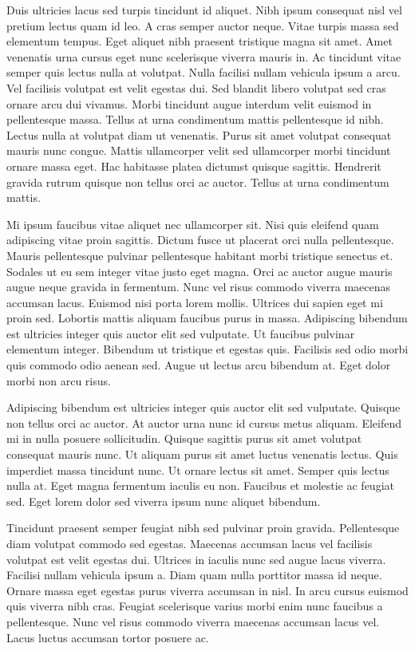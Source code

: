 \documentclass[11pt,a4paper]{article}
\begin{document}
Duis ultricies lacus sed turpis tincidunt id aliquet. Nibh ipsum consequat nisl vel pretium lectus quam id leo. A cras semper auctor neque. Vitae turpis massa sed elementum tempus. Eget aliquet nibh praesent tristique magna sit amet. Amet venenatis urna cursus eget nunc scelerisque viverra mauris in. Ac tincidunt vitae semper quis lectus nulla at volutpat. Nulla facilisi nullam vehicula ipsum a arcu. Vel facilisis volutpat est velit egestas dui. Sed blandit libero volutpat sed cras ornare arcu dui vivamus. Morbi tincidunt augue interdum velit euismod in pellentesque massa. Tellus at urna condimentum mattis pellentesque id nibh. Lectus nulla at volutpat diam ut venenatis. Purus sit amet volutpat consequat mauris nunc congue. Mattis ullamcorper velit sed ullamcorper morbi tincidunt ornare massa eget. Hac habitasse platea dictumst quisque sagittis. Hendrerit gravida rutrum quisque non tellus orci ac auctor. Tellus at urna condimentum mattis.

Mi ipsum faucibus vitae aliquet nec ullamcorper sit. Nisi quis eleifend quam adipiscing vitae proin sagittis. Dictum fusce ut placerat orci nulla pellentesque. Mauris pellentesque pulvinar pellentesque habitant morbi tristique senectus et. Sodales ut eu sem integer vitae justo eget magna. Orci ac auctor augue mauris augue neque gravida in fermentum. Nunc vel risus commodo viverra maecenas accumsan lacus. Euismod nisi porta lorem mollis. Ultrices dui sapien eget mi proin sed. Lobortis mattis aliquam faucibus purus in massa. Adipiscing bibendum est ultricies integer quis auctor elit sed vulputate. Ut faucibus pulvinar elementum integer. Bibendum ut tristique et egestas quis. Facilisis sed odio morbi quis commodo odio aenean sed. Augue ut lectus arcu bibendum at. Eget dolor morbi non arcu risus.

Adipiscing bibendum est ultricies integer quis auctor elit sed vulputate. Quisque non tellus orci ac auctor. At auctor urna nunc id cursus metus aliquam. Eleifend mi in nulla posuere sollicitudin. Quisque sagittis purus sit amet volutpat consequat mauris nunc. Ut aliquam purus sit amet luctus venenatis lectus. Quis imperdiet massa tincidunt nunc. Ut ornare lectus sit amet. Semper quis lectus nulla at. Eget magna fermentum iaculis eu non. Faucibus et molestie ac feugiat sed. Eget lorem dolor sed viverra ipsum nunc aliquet bibendum.

Tincidunt praesent semper feugiat nibh sed pulvinar proin gravida. Pellentesque diam volutpat commodo sed egestas. Maecenas accumsan lacus vel facilisis volutpat est velit egestas dui. Ultrices in iaculis nunc sed augue lacus viverra. Facilisi nullam vehicula ipsum a. Diam quam nulla porttitor massa id neque. Ornare massa eget egestas purus viverra accumsan in nisl. In arcu cursus euismod quis viverra nibh cras. Feugiat scelerisque varius morbi enim nunc faucibus a pellentesque. Nunc vel risus commodo viverra maecenas accumsan lacus vel. Lacus luctus accumsan tortor posuere ac.
\end{document}
